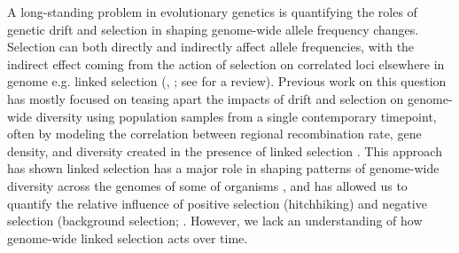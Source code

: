 \documentclass[11pt]{article}
\begin{document}
A long-standing problem in evolutionary genetics is quantifying the roles of
genetic drift and selection in shaping genome-wide allele frequency changes.
Selection can both directly and indirectly affect allele frequencies, with the
indirect effect coming from the action of selection on correlated loci
elsewhere in genome e.g. linked selection (\cite{Maynard_Smith1974-lc},
\cite{Charlesworth1993-gb,Nordborg1996-nq}; see \cite{Barton2000-zg} for a
review). Previous work on this question has mostly focused on teasing apart
the impacts of drift and selection on genome-wide diversity using population
samples from a single contemporary timepoint, often by modeling the correlation
between regional recombination rate, gene density, and diversity created in the
presence of linked selection \parencite{Begun1992-ey,Elyashiv2016-vt}. This
approach has shown linked selection has a major role in shaping patterns of
genome-wide diversity across the genomes of some of organisms
\parencite{Begun2007-bg,Beissinger2016-cm,Sattath2011-dr,Williamson2014-oy,Andersen2012-bj,Cutter2010-gi},
and has allowed us to quantify the relative influence of positive selection
(hitchhiking) and negative selection (background selection;
\cite{Nordborg2005-dc,McVicker2009-ax,Hernandez2011-gs,Elyashiv2016-vt}.
However, we lack an understanding of how genome-wide linked selection acts over
time.
\end{document}
